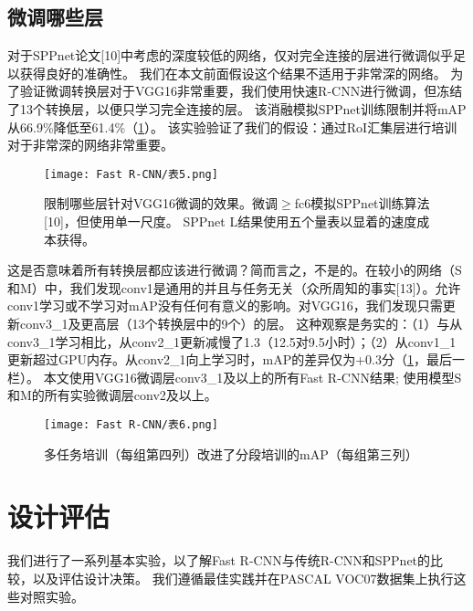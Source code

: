 \subsection{微调哪些层}
\par 对于SPPnet论文[10]中考虑的深度较低的网络，仅对完全连接的层进行微调似乎足以获得良好的准确性。 我们在本文前面假设这个结果不适用于非常深的网络。 为了验证微调转换层对于VGG16非常重要，我们使用快速R-CNN进行微调，但冻结了13个转换层，以便只学习完全连接的层。 该消融模拟SPPnet训练限制并将mAP从66.9\%降低至61.4\%（\ref{表5}）。 该实验验证了我们的假设：通过RoI汇集层进行培训对于非常深的网络非常重要。

\begin{figure}[h]
    \centering
    \texttt{[image: Fast R-CNN/表5.png]}
    \caption{限制哪些层针对VGG16微调的效果。微调$\geq$fc6模拟SPPnet训练算法[10]，但使用单一尺度。 SPPnet L结果使用五个量表以显着的速度成本获得。}
    \label{表5}
\end{figure}
\par 这是否意味着所有转换层都应该进行微调？简而言之，不是的。在较小的网络（S和M）中，我们发现conv1是通用的并且与任务无关（众所周知的事实[13]）。允许conv1学习或不学习对mAP没有任何有意义的影响。对VGG16，我们发现只需更新conv3\_1及更高层（13个转换层中的9个）的层。 这种观察是务实的：（1）与从conv3\_1学习相比，从conv2\_1更新减慢了1.3（12.5对9.5小时）；（2）从conv1\_1更新超过GPU内存。从conv2\_1向上学习时，mAP的差异仅为+0.3分（\ref{表5}，最后一栏）。 本文使用VGG16微调层conv3\_1及以上的所有Fast R-CNN结果; 使用模型S和M的所有实验微调层conv2及以上。

\begin{figure}[h]
    \centering
    \texttt{[image: Fast R-CNN/表6.png]}
    \caption{多任务培训（每组第四列）改进了分段培训的mAP（每组第三列）}
    \label{表6}
\end{figure}

\section{设计评估}
\par 我们进行了一系列基本实验，以了解Fast R-CNN与传统R-CNN和SPPnet的比较，以及评估设计决策。 我们遵循最佳实践并在PASCAL VOC07数据集上执行这些对照实验。

